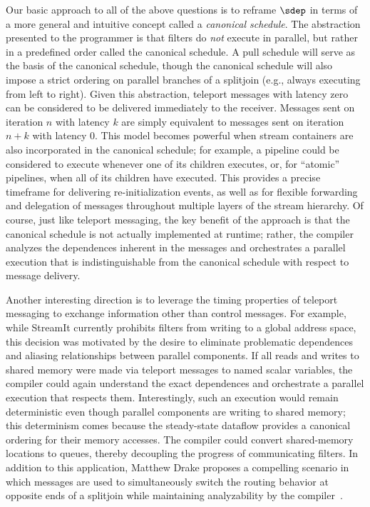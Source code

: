 Our basic approach to all of the above questions is to reframe $\sdep$
in terms of a more general and intuitive concept called a {\it
  canonical schedule}.  The abstraction presented to the programmer is
that filters do {\it not} execute in parallel, but rather in a
predefined order called the canonical schedule.  A pull schedule will
serve as the basis of the canonical schedule, though the canonical
schedule will also impose a strict ordering on parallel branches of a
splitjoin (e.g., always executing from left to right).  Given this
abstraction, teleport messages with latency zero can be considered to
be delivered immediately to the receiver.  Messages sent on iteration
$n$ with latency $k$ are simply equivalent to messages sent on
iteration $n+k$ with latency $0$.  This model becomes powerful when
stream containers are also incorporated in the canonical schedule; for
example, a pipeline could be considered to execute whenever one of its
children executes, or, for ``atomic'' pipelines, when all of its
children have executed.  This provides a precise timeframe for
delivering re-initialization events, as well as for flexible
forwarding and delegation of messages throughout multiple layers of
the stream hierarchy.  Of course, just like teleport messaging, the
key benefit of the approach is that the canonical schedule is not
actually implemented at runtime; rather, the compiler analyzes the
dependences inherent in the messages and orchestrates a parallel
execution that is indistinguishable from the canonical schedule with
respect to message delivery.

Another interesting direction is to leverage the timing properties of
teleport messaging to exchange information other than control
messages.  For example, while StreamIt currently prohibits filters
from writing to a global address space, this decision was motivated by
the desire to eliminate problematic dependences and aliasing
relationships between parallel components.  If all reads and writes to
shared memory were made via teleport messages to named scalar
variables, the compiler could again understand the exact dependences
and orchestrate a parallel execution that respects them.
Interestingly, such an execution would remain deterministic even
though parallel components are writing to shared memory; this
determinism comes because the steady-state dataflow provides a
canonical ordering for their memory accesses.  The compiler could
convert shared-memory locations to queues, thereby decoupling the
progress of communicating filters.  In addition to this application,
Matthew Drake proposes a compelling scenario in which messages are
used to simultaneously switch the routing behavior at opposite ends of
a splitjoin while maintaining analyzability by the
compiler~\cite{drake-thesis}.

